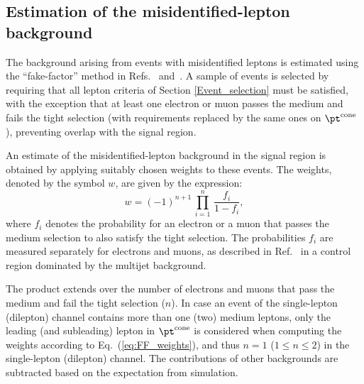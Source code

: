 \subsection{Estimation of the misidentified-lepton background}
\label{sec:backgroundEstimation_fakes}

The background arising from events with misidentified leptons is estimated using the ``fake-factor'' method in Refs.~\cite{ttHmultilepton} and~\cite{HIG17018}.
A sample of events is selected by requiring that all lepton criteria of Section \ref{Event_selection} must be satisfied, with the exception that at least one electron or muon passes the medium and fails the tight selection (with \pt requirements replaced by the same ones on $\pt^{\text{cone}}$), preventing overlap with the signal region.

An estimate of the misidentified-lepton background in the signal region is obtained by applying suitably chosen weights to these events.
The weights, denoted by the symbol $w$, are given by the expression:
  \begin{equation}
    w = (-1)^{n+1} \, \prod_{i=1}^{n} \, \frac{f_{i}}{1 - f_{i}},
    \label{eq:FF_weights}
  \end{equation}
where $f_{i}$ denotes the probability for an electron or a muon that passes the medium selection to also satisfy the tight selection. The probabilities $f_{i}$ are measured separately for electrons and muons, as described in Ref.~\cite{ttHmultilepton} in a control region dominated by the multijet background.

The product extends over the number of electrons and muons that pass the medium and fail the tight selection ($n$). In case an event of the single-lepton (dilepton) channel contains more than one (two) medium leptons, only the leading (and subleading) lepton in $\pt^{\text{cone}}$ is considered when computing the weights according to Eq.~(\ref{eq:FF_weights}), and thus $n = 1$ ($1 \leq n \leq 2$) in the single-lepton (dilepton) channel. The contributions of other backgrounds are subtracted based on the expectation from simulation.






